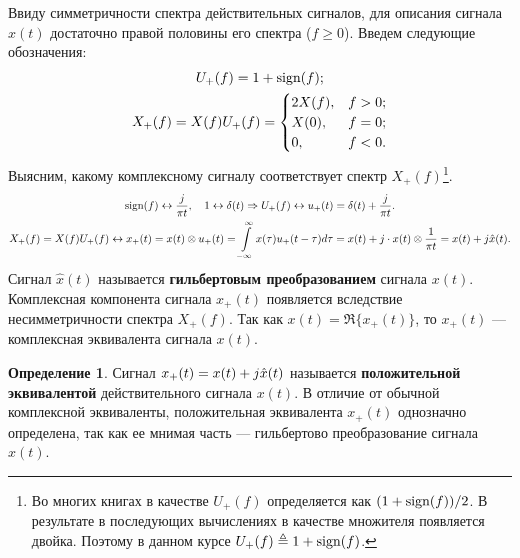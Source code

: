 \documentclass{book}
\numberwithin{theorem}{chapter}
\numberwithin{statement}{chapter}
\numberwithin{lemma}{chapter}
\theoremstyle{definition}
\numberwithin{task}{chapter}
\theoremstyle{remark}
\numberwithin{example}{chapter}
\theoremstyle{definition}
\newtheorem{definition}{Определение}
\numberwithin{definition}{chapter}
\theoremstyle{remark}
\theoremstyle{remark}
\numberwithin{lyrics}{section}
\begin{document}
Ввиду симметричности спектра действительных сигналов, для описания сигнала $x(t)$ достаточно правой половины его спектра ($f \ge 0$). 
Введем следующие обозначения:
\begin{gather*}
U_+(f) = 1 + \text{sign}(f); \\
X_+(f) = X(f) U_{+}(f) = \begin{cases}
2X(f), & f > 0;\\
X(0),  & f = 0;\\
0, & f < 0.
\end{cases}
\end{gather*}
Выясним, какому комплексному сигналу соответствует спектр $X_+(f)$\footnote{Во многих книгах в качестве $U_+(f)$ определяется как $(1 + \text{sign}(f)) / 2$. В результате в последующих вычислениях в качестве множителя появляется двойка. Поэтому в данном курсе $U_+(f) \triangleq 1 + \text{sign}(f)$.}. 
\begin{gather*}
\text{sign}(f) \leftrightarrow \frac{j}{\pi t},\quad 1 \leftrightarrow \delta(t) \Rightarrow U_+(f) \leftrightarrow u_+(t) = \delta(t) + \frac{j}{\pi t}. \\
X_+(f) = X(f) U_+(f)  \leftrightarrow x_+(t) = x(t) \otimes u_+(t) = \int\limits_{-\infty}^{\infty} x(\tau) u_+(t - \tau)d\tau = x(t) + j \cdot x(t) \otimes \frac{1}{\pi t} = x(t) + j\hat{x}(t).\\
\end{gather*}
Сигнал $\hat{x}(t)$ называется \textbf{гильбертовым преобразованием} сигнала $x(t)$. Комплексная компонента сигнала $x_+(t)$ появляется вследствие несимметричности спектра $X_+(f)$. Так как $x(t) = \Re\{x_+(t)\}$, то $x_+(t)$ --- комплексная эквивалента сигнала $x(t)$.
\begin{definition}
Сигнал $x_+(t) = x(t) + j\hat{x}(t)$ называется \textbf{положительной эквивалентой} действительного сигнала $x(t)$. В отличие от обычной комплексной эквиваленты, положительная эквивалента $x_+(t)$ однозначно определена, так как ее мнимая часть --- гильбертово преобразование сигнала $x(t)$.
\end{definition}
\end{document}
